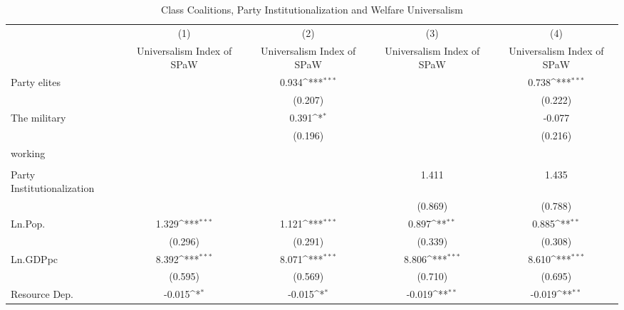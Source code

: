 \begin{table}[htbp]\centering
\def\sym#1{\ifmmode^{#1}\else\(^{#1}\)\fi}
\caption{Class Coalitions, Party Institutionalization and Welfare Universalism}
\begin{tabular}{l*{4}{c}}
\hline\hline
                    &\multicolumn{1}{c}{(1)}         &\multicolumn{1}{c}{(2)}         &\multicolumn{1}{c}{(3)}         &\multicolumn{1}{c}{(4)}         \\
                    &Universalism Index of SPaW         &Universalism Index of SPaW         &Universalism Index of SPaW         &Universalism Index of SPaW         \\
\hline
Party elites        &                     &       0.934\sym{***}&                     &       0.738\sym{***}\\
                    &                     &     (0.207)         &                     &     (0.222)         \\
[1em]
The military        &                     &       0.391\sym{*}  &                     &      -0.077         \\
                    &                     &     (0.196)         &                     &     (0.216)         \\
[1em]
working             &                     &                     &                     &                     \\
                    &                     &                     &                     &                     \\
[1em]
Party Institutionalization&                     &                     &       1.411         &       1.435         \\
                    &                     &                     &     (0.869)         &     (0.788)         \\
[1em]
Ln.Pop.             &       1.329\sym{***}&       1.121\sym{***}&       0.897\sym{**} &       0.885\sym{**} \\
                    &     (0.296)         &     (0.291)         &     (0.339)         &     (0.308)         \\
[1em]
Ln.GDPpc            &       8.392\sym{***}&       8.071\sym{***}&       8.806\sym{***}&       8.610\sym{***}\\
                    &     (0.595)         &     (0.569)         &     (0.710)         &     (0.695)         \\
[1em]
Resource Dep.       &      -0.015\sym{*}  &      -0.015\sym{*}  &      -0.019\sym{**} &      -0.019\sym{**} \\

\end{tabular}
\end{table}
